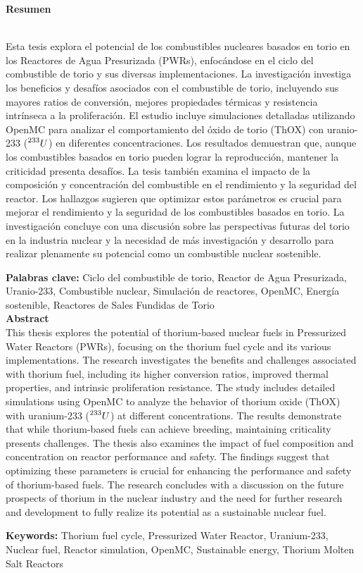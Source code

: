 \textbf{\LARGE Resumen}
\\
Esta tesis explora el potencial de los combustibles nucleares basados en torio en los Reactores de Agua Presurizada (PWRs), enfocándose en el ciclo del combustible de torio y sus diversas implementaciones. La investigación investiga los beneficios y desafíos asociados con el combustible de torio, incluyendo sus mayores ratios de conversión, mejores propiedades térmicas y resistencia intrínseca a la proliferación. El estudio incluye simulaciones detalladas utilizando OpenMC para analizar el comportamiento del óxido de torio (ThOX) con uranio-233 (\(\prescript{233}{}{U}\)) en diferentes concentraciones. Los resultados demuestran que, aunque los combustibles basados en torio pueden lograr la reproducción, mantener la criticidad presenta desafíos. La tesis también examina el impacto de la composición y concentración del combustible en el rendimiento y la seguridad del reactor. Los hallazgos sugieren que optimizar estos parámetros es crucial para mejorar el rendimiento y la seguridad de los combustibles basados en torio. La investigación concluye con una discusión sobre las perspectivas futuras del torio en la industria nuclear y la necesidad de más investigación y desarrollo para realizar plenamente su potencial como un combustible nuclear sostenible.

\vspace{1.0cm}

\textbf{\small Palabras clave:} Ciclo del combustible de torio, Reactor de Agua Presurizada, Uranio-233, Combustible nuclear, Simulación de reactores, OpenMC, Energía sostenible, Reactores de Sales Fundidas de Torio\\

\newpage
\textbf{\LARGE Abstract}\\

This thesis explores the potential of thorium-based nuclear fuels in Pressurized Water Reactors (PWRs), focusing on the thorium fuel cycle and its various implementations. The research investigates the benefits and challenges associated with thorium fuel, including its higher conversion ratios, improved thermal properties, and intrinsic proliferation resistance. The study includes detailed simulations using OpenMC to analyze the behavior of thorium oxide (ThOX) with uranium-233 (\(\prescript{233}{}{U}\)) at different concentrations. The results demonstrate that while thorium-based fuels can achieve breeding, maintaining criticality presents challenges. The thesis also examines the impact of fuel composition and concentration on reactor performance and safety. The findings suggest that optimizing these parameters is crucial for enhancing the performance and safety of thorium-based fuels. The research concludes with a discussion on the future prospects of thorium in the nuclear industry and the need for further research and development to fully realize its potential as a sustainable nuclear fuel.

\vspace{1.0cm}

\textbf{\small Keywords:} Thorium fuel cycle, Pressurized Water Reactor, Uranium-233, Nuclear fuel, Reactor simulation, OpenMC, Sustainable energy, Thorium Molten Salt Reactors\\